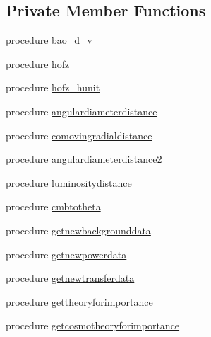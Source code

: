 \subsection*{Private Member Functions}
\begin{DoxyCompactItemize}
\item 
procedure \mbox{\hyperlink{structcalculator__cosmology_1_1tcosmologycalculator_aca6cfa1073bbab4386ae998526390538}{bao\+\_\+d\+\_\+v}}
\item 
procedure \mbox{\hyperlink{structcalculator__cosmology_1_1tcosmologycalculator_a68b9c5265548ae950a6b73619423a742}{hofz}}
\item 
procedure \mbox{\hyperlink{structcalculator__cosmology_1_1tcosmologycalculator_a2f6aec787f9402883fb9a57a1a9637ef}{hofz\+\_\+hunit}}
\item 
procedure \mbox{\hyperlink{structcalculator__cosmology_1_1tcosmologycalculator_a534991fa7fb6aff23cd5ed4d6c2f8fb3}{angulardiameterdistance}}
\item 
procedure \mbox{\hyperlink{structcalculator__cosmology_1_1tcosmologycalculator_a4c59e9a86937f1c2b4cecd0fac8cd6d2}{comovingradialdistance}}
\item 
procedure \mbox{\hyperlink{structcalculator__cosmology_1_1tcosmologycalculator_adc787e581a28225d3e6554971d670416}{angulardiameterdistance2}}
\item 
procedure \mbox{\hyperlink{structcalculator__cosmology_1_1tcosmologycalculator_a6eaabf554c1c9311cf18ec006ab17949}{luminositydistance}}
\item 
procedure \mbox{\hyperlink{structcalculator__cosmology_1_1tcosmologycalculator_a7fb0911648c5fccf40491109d49f1f31}{cmbtotheta}}
\item 
procedure \mbox{\hyperlink{structcalculator__cosmology_1_1tcosmologycalculator_a2376146714cc3bcdf5f0c8def095f9ba}{getnewbackgrounddata}}
\item 
procedure \mbox{\hyperlink{structcalculator__cosmology_1_1tcosmologycalculator_a53acdf186c6667eb1fe9161c61fa06f4}{getnewpowerdata}}
\item 
procedure \mbox{\hyperlink{structcalculator__cosmology_1_1tcosmologycalculator_a43f66adffdcefb4ea6b5de76a98aaac8}{getnewtransferdata}}
\item 
procedure \mbox{\hyperlink{structcalculator__cosmology_1_1tcosmologycalculator_aa67a2785fecc660f0dffb7c5db342f2e}{gettheoryforimportance}}
\item 
procedure \mbox{\hyperlink{structcalculator__cosmology_1_1tcosmologycalculator_a0b75f0ae19f1d85c4b7b42639da84535}{getcosmotheoryforimportance}}

\end{DoxyCompactItemize}
